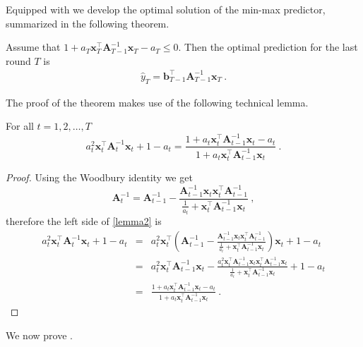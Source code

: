 Equipped with
 we develop the optimal solution of the min-max
predictor, summarized in the following theorem.
%
\begin{theorem}
\label{thm:theorem1}
Assume that $1+a_{T}\mathbf{x}_{T}^{\top}\mathbf{A}_{T-1}^{-1}\mathbf{x}_{T}-a_{T}\leq0$.
Then the optimal prediction for the last round $T$ is
\begin{align}
\hat{y}_{T}=\mathbf{b}_{T-1}^{\top}\mathbf{A}_{T-1}^{-1}\mathbf{x}_{T}
~. \label{laststep_minmax_optimal}
\end{align}
\end{theorem}
%
The proof of the theorem makes use of the following technical lemma.
\begin{lemma}
\label{lem:lemma2}
For all $t=1,2,\ldots,T$
\begin{equation}
a_{t}^{2}\mathbf{x}_{t}^{\top}\mathbf{A}_{t}^{-1}\mathbf{x}_{t}+1-a_{t}=\frac{1+a_{t}\mathbf{x}_{t}^{\top}\mathbf{A}_{t-1}^{-1}\mathbf{x}_{t}-a_{t}}{1+a_{t}\mathbf{x}_{t}^{\top}\mathbf{A}_{t-1}^{-1}\mathbf{x}_{t}}
~. \label{lemma2}
\end{equation}
\end{lemma}
\begin{proof}
Using the Woodbury identity we get
\[
\mathbf{A}_{t}^{-1}=\mathbf{A}_{t-1}^{-1}-\frac{\mathbf{A}_{t-1}^{-1}\mathbf{x}_{t}\mathbf{x}_{t}^{\top}\mathbf{A}_{t-1}^{-1}}{\frac{1}{a_{t}}+\mathbf{x}_{t}^{\top}\mathbf{A}_{t-1}^{-1}\mathbf{x}_{t}}~,
\]
 therefore the left side of \eqref{lemma2} is
\begin{eqnarray*}
a_{t}^{2}\mathbf{x}_{t}^{\top}\mathbf{A}_{t}^{-1}\mathbf{x}_{t}+1-a_{t}
 &=&  a_{t}^{2}\mathbf{x}_{t}^{\top}\left(\mathbf{A}_{t-1}^{-1}-\frac{\mathbf{A}_{t-1}^{-1}\mathbf{x}_{t}\mathbf{x}_{t}^{\top}\mathbf{A}_{t-1}^{-1}}{\frac{1}{a_{t}}+\mathbf{x}_{t}^{\top}\mathbf{A}_{t-1}^{-1}\mathbf{x}_{t}}\right)\mathbf{x}_{t}+1-a_{t}\\
  &=&  a_{t}^{2}\mathbf{x}_{t}^{\top}\mathbf{A}_{t-1}^{-1}\mathbf{x}_{t}-\frac{a_{t}^{2}\mathbf{x}_{t}^{\top}\mathbf{A}_{t-1}^{-1}\mathbf{x}_{t}\mathbf{x}_{t}^{\top}\mathbf{A}_{t-1}^{-1}\mathbf{x}_{t}}{\frac{1}{a_{t}}+\mathbf{x}_{t}^{\top}\mathbf{A}_{t-1}^{-1}\mathbf{x}_{t}}+1-a_{t}\\
  &=&  \frac{1+a_{t}\mathbf{x}_{t}^{\top}\mathbf{A}_{t-1}^{-1}\mathbf{x}_{t}-a_{t}}{1+a_{t}\mathbf{x}_{t}^{\top}\mathbf{A}_{t-1}^{-1}\mathbf{x}_{t}}~.
\end{eqnarray*}
\QED
 \end{proof}
We now prove .
